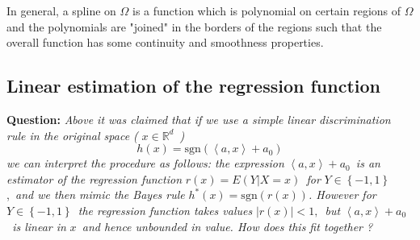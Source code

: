 \documentclass[11pt,twoside]{article}%
\theoremstyle{change}
\begin{document}
In general, a spline on $\Omega$ is a function which is polynomial on certain
regions of $\Omega$ and the polynomials are "joined" in the borders of the
regions such that the overall function has some continuity and smoothness properties.

\subsection{Linear estimation of the regression function}

\textbf{Question:} \textit{Above it was claimed that if we use a simple linear
discrimination rule in the original space ( }$x\in\mathbb{R}^{d}$\textit{\ ) }%
\[
h(x)=\mathrm{sgn}\left(  \left\langle a,x\right\rangle +a_{0}\right)
\]
\textit{we can interpret the procedure as follows: the expression
}$\left\langle a,x\right\rangle +a_{0}$\textit{\ is an estimator of the
regression function }$r(x)=E\left(  Y|X=x\right)  $\textit{\ for }%
$Y\in\left\{  -1,1\right\}  $,\textit{\ and we then mimic the Bayes rule
}$h^{\ast}(x)=\mathrm{sgn}\left(  r(x)\right)  $\textit{. However for }%
$Y\in\left\{  -1,1\right\}  $\textit{\ the regression function takes values
}$\left\vert r(x)\right\vert <1,$\textit{\ but }$\left\langle a,x\right\rangle
+a_{0}$\textit{\ is linear in }$x$\textit{\ and hence unbounded in value. How
does this fit together ? }

\bigskip
\end{document}
